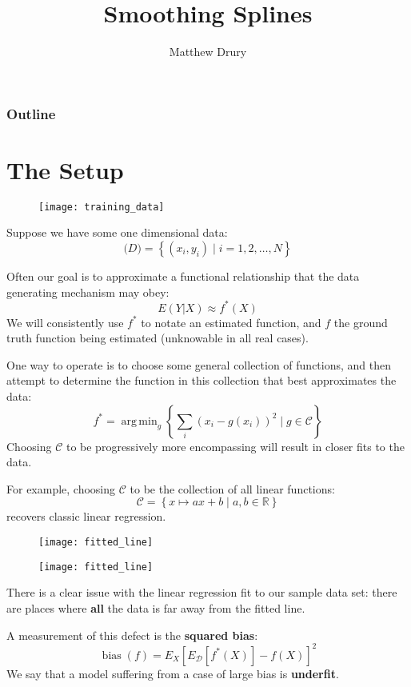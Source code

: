 \documentclass{beamer}
\title{Smoothing Splines}
\author{Matthew Drury}
\DeclareMathOperator*{\argmin}{arg\,min}
\DeclareMathOperator*{\bias}{bias}
\begin{document}
%
\begin{frame}
  \titlepage
\end{frame}
%
\begin{frame}
  \frametitle{Outline}
  \tableofcontents
\end{frame}
%
\section{The Setup}
%
\begin{frame}
  \begin{figure}
    \texttt{[image: training\_data]}
  \end{figure}
  Suppose we have some one dimensional data:
  $$\mathcal(D) = \left\{ (x_i, y_i) \mid i = 1,2,\ldots,N \right\}$$
\end{frame}
%
\begin{frame}
  Often our goal is to approximate a functional relationship that the data generating mechanism may obey:
  $$E(Y|X) \approx f^*(X)$$
  We will consistently use $f^*$ to notate an estimated function, and $f$ the ground truth function being estimated (unknowable in all real cases).
\end{frame}
%
\begin{frame}
  One way to operate is to choose some general collection of functions, and then attempt to determine the function in this collection that best approximates the data:
  $$ f^* = \argmin_{g} \left\{ \sum_i (x_i - g(x_i))^2 \mid g \in \mathcal{C} \right\} $$
  Choosing $\mathcal{C}$ to be progressively more encompassing will result in closer fits to the data.
\end{frame}
%
\begin{frame}
  For example, choosing $\mathcal{C}$ to be the collection of all linear functions:
  $$ \mathcal{C} = \left\{ x \mapsto ax + b \mid a,b \in \mathbb{R} \right\} $$
recovers classic linear regression.
  \begin{figure}
    \texttt{[image: fitted\_line]}
  \end{figure}
\end{frame}
%
\begin{frame}
  \begin{figure}
    \texttt{[image: fitted\_line]}
  \end{figure}
  There is a clear issue with the linear regression fit to our sample data set: there are places where \textbf{all} the data is far away from the fitted line.
\end{frame}
%
\begin{frame}
  A measurement of this defect is the \textbf{squared bias}:
  $$ \bias(f) = E_X \left[ E_{\mathcal{D}}[f^*(X)] - f(X) \right] ^2$$
  We say that a model suffering from a case of large bias is \textbf{underfit}.
\end{frame}
\end{document}
